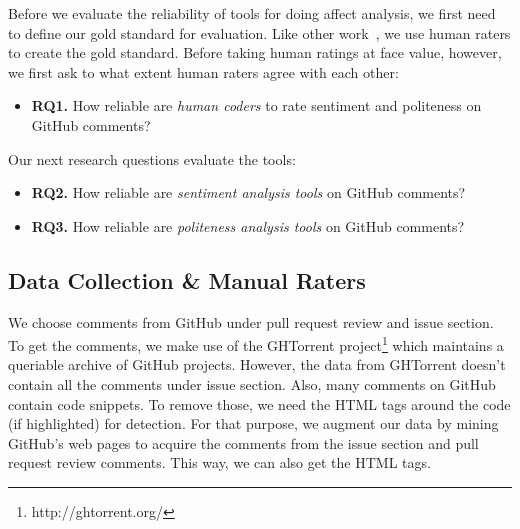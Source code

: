 Before we evaluate the reliability of tools for doing affect analysis,
we first need to define our gold standard for evaluation.
Like other work~\cite{ref, ref, ref}, we use human raters to create
the gold standard.
Before taking human ratings at face value, however, we first ask
to what extent human raters agree with each other:

\begin{itemize}

\item\textbf{RQ1.} How reliable are \emph{human coders} to rate sentiment and politeness on GitHub comments?

\end{itemize}

\noindent
Our next research questions evaluate the tools:

\begin{itemize}

\item\textbf{RQ2.} How reliable are \emph{sentiment analysis tools} on GitHub comments?

\item\textbf{RQ3.} How reliable are \emph{politeness analysis tools} on GitHub comments? 

\end{itemize}

\subsection{Data Collection \& Manual Raters}\label{data}


We choose comments from GitHub under pull request review and issue section. To get the comments, we make use of the GHTorrent project\footnote{http://ghtorrent.org/} which maintains a queriable archive of GitHub projects. However, the data from GHTorrent doesn't contain all the comments under issue section. Also, many comments on GitHub contain code snippets. To remove those, we need the HTML tags around the code (if highlighted) for detection. For that purpose, we augment our data by mining GitHub's web pages to acquire the comments from the issue section and pull request review comments. This way, we can also get the HTML tags.

